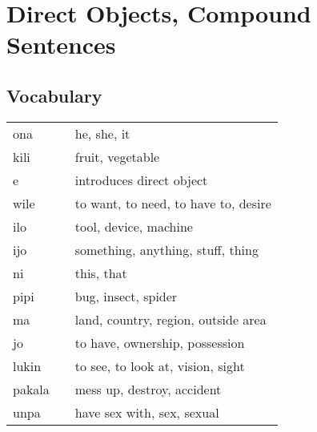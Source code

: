 \section{Direct Objects, Compound Sentences}
%
\subsection*{Vocabulary}
%
\begin{supertabular}{p{5,5cm}|ll}
ona &&  he, she, it  \\
kili && fruit, vegetable  \\
e &&  introduces direct object  \\
wile &&  to want, to need, to have to, desire \\
ilo && tool, device, machine \\
ijo &&  something, anything, stuff, thing   \\             
ni &&  this, that  \\
pipi &&  bug, insect, spider  \\
ma &&  land, country, region, outside area  \\
jo &&  to have, ownership, possession \\
lukin &&  to see, to look at, vision, sight \\
pakala &&  mess up, destroy, accident \\
unpa &&  have sex with, sex, sexual \\
\end{supertabular}  

